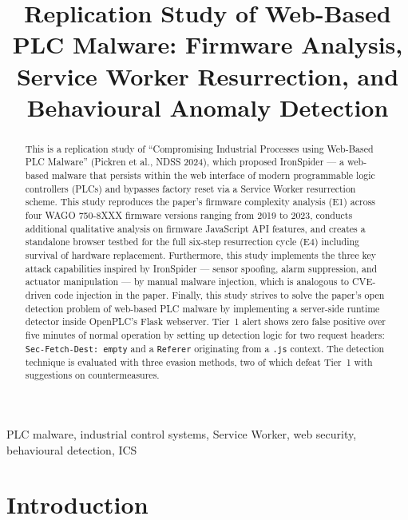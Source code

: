 \documentclass[conference]{IEEEtran}
\title{Replication Study of Web-Based PLC Malware: Firmware Analysis, Service Worker Resurrection, and Behavioural Anomaly Detection}
\author{
  \IEEEauthorblockN{Hojune Kim}
  \IEEEauthorblockA{School of Computing\\
    Korea Advanced Institute of Science and Technology, Daejeon, Republic of Korea\\
    {hojunekim}@kaist.ac.kr}
}
\begin{document}
\maketitle


\begin{abstract}
This is a replication study of ``Compromising Industrial Processes using Web-Based PLC Malware'' (Pickren et al., NDSS 2024), which proposed IronSpider --- a web-based malware that persists within the web interface of modern programmable logic controllers (PLCs) and bypasses factory reset via a Service Worker resurrection scheme.  
%
This study reproduces the paper's firmware complexity analysis (E1) across four WAGO 750-8XXX firmware versions ranging from 2019 to 2023, conducts additional qualitative analysis on firmware JavaScript API features, and creates a standalone browser testbed for the full six-step resurrection cycle (E4) including survival of hardware replacement.
%
Furthermore, this study implements the three key attack capabilities inspired by IronSpider --- sensor spoofing, alarm suppression, and actuator manipulation --- by manual malware injection, which is analogous to CVE-driven code injection in the paper.
%
Finally, this study strives to solve the paper's open detection problem of web-based PLC malware by implementing a server-side runtime detector inside OpenPLC's Flask webserver. Tier~1 alert shows zero false positive over five minutes of normal operation by setting up detection logic for two request headers: \texttt{Sec-Fetch-Dest: empty} and a \texttt{Referer} originating from a \texttt{.js} context. The detection technique is evaluated with three evasion methods, two of which defeat Tier~1 with suggestions on countermeasures. 
\end{abstract}

\begin{IEEEkeywords}
PLC malware, industrial control systems, Service Worker, web security,
behavioural detection, ICS
\end{IEEEkeywords}

\section{Introduction}
\end{document}
